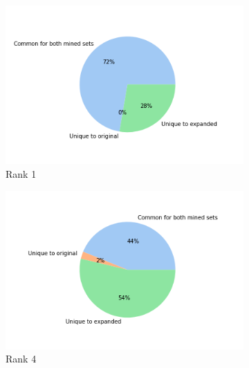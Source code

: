 \begin{figure}[h]
        \centering
        \begin{subfigure}[b]{0.3\textwidth}
            \centering
            \includegraphics[width=\textwidth]{figures/results/ranks/pie_charts/('rank_cutoff', 1)_family.png}
            \caption[]%
            {{\small Rank 1}}    
            \label{fig:rank_1_pie_family}
        \end{subfigure}
        \begin{subfigure}[b]{0.3\textwidth}  
            \centering 
            \includegraphics[width=\textwidth]{figures/results/ranks/pie_charts/('rank_cutoff', 4)_family.png}
            \caption[]%
            {{\small Rank 4}}    
            \label{fig:rank_4_pie_family}
        \end{subfigure}
        \begin{subfigure}[b]{0.3\textwidth}   

\end{subfigure}
\end{figure}

